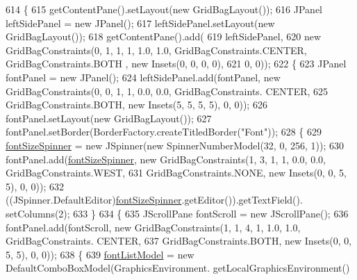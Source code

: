 \begin{DoxyCode}
614                                          \{
615         getContentPane().setLayout(\textcolor{keyword}{new} GridBagLayout());
616         JPanel leftSidePanel = \textcolor{keyword}{new} JPanel();
617         leftSidePanel.setLayout(\textcolor{keyword}{new} GridBagLayout());
618         getContentPane().add(
619             leftSidePanel,
620             \textcolor{keyword}{new} GridBagConstraints(0, 1, 1, 1, 1.0, 1.0, GridBagConstraints.CENTER, GridBagConstraints.BOTH
      , \textcolor{keyword}{new} Insets(0, 0, 0, 0),
621                 0, 0));
622         \{
623             JPanel fontPanel = \textcolor{keyword}{new} JPanel();
624             leftSidePanel.add(fontPanel, \textcolor{keyword}{new} GridBagConstraints(0, 0, 1, 1, 0.0, 0.0, GridBagConstraints.
      CENTER,
625                 GridBagConstraints.BOTH, \textcolor{keyword}{new} Insets(5, 5, 5, 5), 0, 0));
626             fontPanel.setLayout(\textcolor{keyword}{new} GridBagLayout());
627             fontPanel.setBorder(BorderFactory.createTitledBorder(\textcolor{stringliteral}{"Font"}));
628             \{
629                 \mbox{\hyperlink{classorg_1_1newdawn_1_1slick_1_1tools_1_1hiero_1_1_hiero_ad5c1f797cd6441f6df9618124e3d6d77}{fontSizeSpinner}} = \textcolor{keyword}{new} JSpinner(\textcolor{keyword}{new} SpinnerNumberModel(32, 0, 256, 1));
630                 fontPanel.add(\mbox{\hyperlink{classorg_1_1newdawn_1_1slick_1_1tools_1_1hiero_1_1_hiero_ad5c1f797cd6441f6df9618124e3d6d77}{fontSizeSpinner}}, \textcolor{keyword}{new} GridBagConstraints(1, 3, 1, 1, 0.0, 0.0, 
      GridBagConstraints.WEST,
631                     GridBagConstraints.NONE, \textcolor{keyword}{new} Insets(0, 0, 5, 5), 0, 0));
632                 ((JSpinner.DefaultEditor)\mbox{\hyperlink{classorg_1_1newdawn_1_1slick_1_1tools_1_1hiero_1_1_hiero_ad5c1f797cd6441f6df9618124e3d6d77}{fontSizeSpinner}}.getEditor()).getTextField().
      setColumns(2);
633             \}
634             \{
635                 JScrollPane fontScroll = \textcolor{keyword}{new} JScrollPane();
636                 fontPanel.add(fontScroll, \textcolor{keyword}{new} GridBagConstraints(1, 1, 4, 1, 1.0, 1.0, GridBagConstraints.
      CENTER,
637                     GridBagConstraints.BOTH, \textcolor{keyword}{new} Insets(0, 0, 5, 5), 0, 0));
638                 \{
639                     \mbox{\hyperlink{classorg_1_1newdawn_1_1slick_1_1tools_1_1hiero_1_1_hiero_ac28e49cac9b1a55afde4633a80c0102f}{fontListModel}} = \textcolor{keyword}{new} DefaultComboBoxModel(GraphicsEnvironment.
      getLocalGraphicsEnvironment()

\end{DoxyCode}
